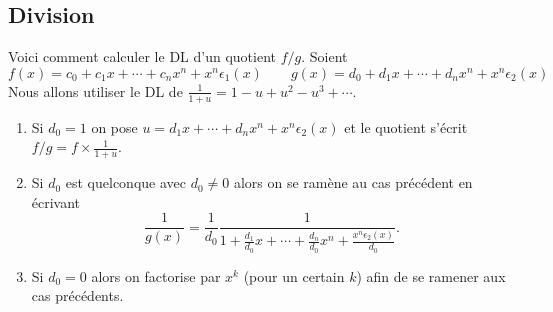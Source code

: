 \documentclass[class=report,crop=false]{standalone}
\begin{document}
\subsection{Division}

Voici comment calculer le DL d'un quotient $f/g$. Soient
$$f(x)=c_0+c_1x + \cdots +c_nx^n + x^n\epsilon_1(x) \qquad
g(x)=d_0+d_1x + \cdots +d_nx^n + x^n\epsilon_2(x)$$
Nous allons utiliser le DL de $\frac{1}{1+u} = 1-u+u^2-u^3+\cdots$.

\begin{enumerate}
  \item Si $d_0= 1$ on pose $u = d_1x + \cdots +d_nx^n + x^n\epsilon_2(x) $
et le quotient s'écrit $f/g = f \times \frac{1}{1+u}$.
  \item Si $d_0$ est quelconque avec $d_0 \neq 0$ alors
on se ramène au cas précédent en écrivant
\[
\frac{1}{g(x)} =\frac{1}{d_0} \frac{1}{1+\frac{d_1}{d_0}x+\cdots+\frac{d_n}{d_0}x^n
+\frac{x^n\epsilon_2(x)}{d_0}}.
\]

  \item Si $d_0=0$ alors on factorise par $x^k$ (pour un certain $k$) afin de se ramener aux cas précédents.
\end{enumerate}
\end{document}
